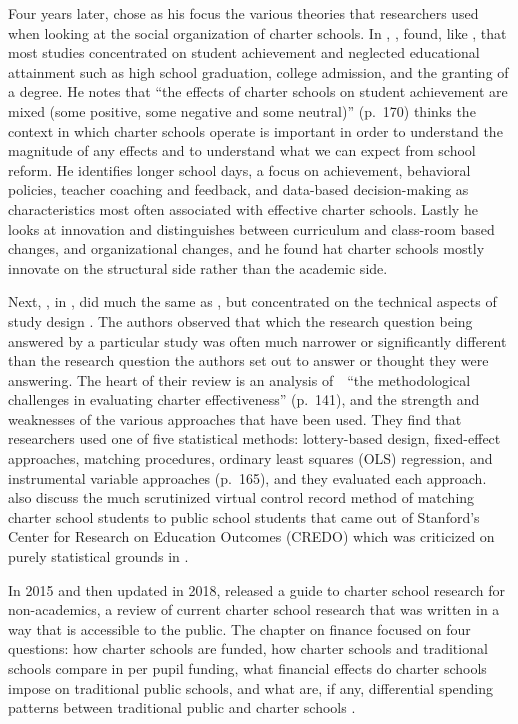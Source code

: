 Four years later, \textcite{Berends2015} chose as his focus the various theories that researchers used when looking at the social organization of charter schools. In , \textcite{Berends2015}, found, like \citeauthor{Smith.etal2011}, that most studies concentrated on student achievement and neglected educational attainment such as high school graduation, college admission, and the granting of a degree. He notes that ``the effects of charter schools on student achievement are mixed (some positive, some negative and some neutral)'' (p.~170) \citeauthor{Berends2015} thinks the context in which charter schools operate is important in order to understand the magnitude of any effects and to understand what we can expect from school reform. He identifies longer school days, a focus on achievement, behavioral policies, teacher coaching and feedback, and data-based decision-making as characteristics most often associated with effective charter schools. Lastly he looks at innovation and distinguishes between curriculum and class-room based changes, and organizational changes, and he found hat charter schools mostly innovate on the structural side rather than the academic side. 

Next, \textcite{Epple.etal2016}, in , did much the same as \citeauthor{Berends2015}, but concentrated on the technical aspects of study design \parencite{Epple.etal2016}. The authors observed that which the research question being answered by a particular study was often much narrower or significantly different than the research question the authors set out to answer or thought they were answering. The heart of their review is an analysis of  ``the methodological challenges in evaluating charter effectiveness'' (p.~141), and the strength and weaknesses of the various approaches that have been used. They find that researchers used one of five statistical methods: lottery-based design, fixed-effect approaches,  matching procedures, ordinary least squares (OLS) regression, and instrumental variable approaches (p.~165), and they evaluated each approach. \citeauthor{Epple.etal2016} also discuss the much scrutinized virtual control record method of matching charter school students to public school students that came out of Stanford's Center for Research on Education Outcomes (CREDO) which was criticized on purely statistical grounds in \textcite{Gabor2015}. 

In 2015 and then updated in 2018, \citeauthor{PublicAgenda2018} released a guide to charter school research for non-academics, a review of current charter school research that was written in a way that is accessible to the public. The chapter on finance focused on four questions: how charter schools are funded, how charter schools and traditional schools compare in per pupil funding, what financial effects do charter schools impose on traditional public schools, and what are, if any, differential spending patterns between traditional public and charter schools \parencite[78–89]{PublicAgenda2018}.

